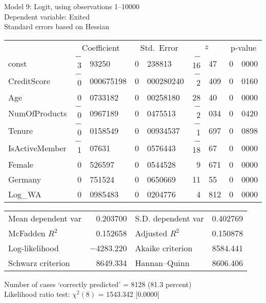 \documentclass[11pt]{article}
\begin{document}
\thispagestyle{empty}

\begin{center}

Model 9: Logit, using observations 1--10000\\
Dependent variable: Exited\\
Standard errors based on Hessian

\vspace{1em}

\begin{tabular}{lr@{.}lr@{.}lr@{.}lr@{.}l}
  &
 \multicolumn{2}{c}{Coefficient} &
  \multicolumn{2}{c}{Std.\ Error} &
   \multicolumn{2}{c}{$z$} &
    \multicolumn{2}{c}{p-value} \\[1ex]
const &
  $-$3&93250 &
    0&238813 &
      $-$16&47 &
        0&0000 \\
CreditScore &
  $-$0&000675198 &
    0&000280240 &
      $-$2&409 &
        0&0160 \\
Age &
  0&0733182 &
    0&00258180 &
      28&40 &
        0&0000 \\
NumOfProducts &
  $-$0&0967189 &
    0&0475513 &
      $-$2&034 &
        0&0420 \\
Tenure &
  $-$0&0158549 &
    0&00934537 &
      $-$1&697 &
        0&0898 \\
IsActiveMember &
  $-$1&07631 &
    0&0576443 &
      $-$18&67 &
        0&0000 \\
Female &
  0&526597 &
    0&0544528 &
      9&671 &
        0&0000 \\
Germany &
  0&751524 &
    0&0650669 &
      11&55 &
        0&0000 \\
Log\_WA &
  0&0985483 &
    0&0204776 &
      4&812 &
        0&0000 \\
\end{tabular}

\vspace{1ex}
\begin{tabular}{lrlr}
Mean dependent var &  0.203700 & S.D. dependent var &  0.402769 \\
McFadden $R^2$ &  0.152658 & Adjusted $R^2$ &  0.150878 \\
Log-likelihood & $-$4283.220 & Akaike criterion &  8584.441 \\
Schwarz criterion &  8649.334 & Hannan--Quinn &  8606.406 \\
\end{tabular}


\vspace{1ex}
\vspace{1em}
\begin{raggedright}
Number of cases `correctly predicted' = 8128 (81.3 percent)\\
Likelihood ratio test: $\chi^2(8)$ = 1543.342 [0.0000]\\
\end{raggedright}

\end{center}
\end{document}
